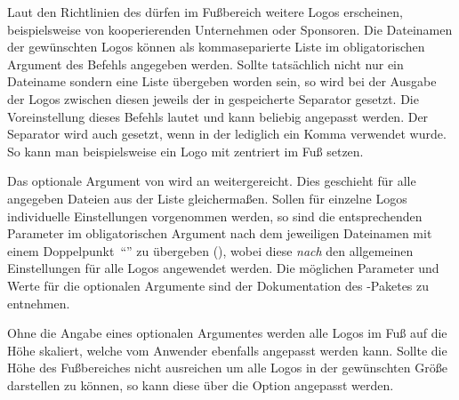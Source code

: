 \begin{Declaration}[v2.03]{%
  \LParameter{}%
}
\begin{Declaration}[v2.03]{}%
\begin{Declaration}[v2.03]{}%
\printdeclarationlist%
%
%

Laut den Richtlinien des \CDs dürfen im Fußbereich weitere Logos erscheinen, 
beispielsweise von kooperierenden Unternehmen oder Sponsoren. Die Dateinamen 
der gewünschten Logos können als kommaseparierte Liste im obligatorischen 
Argument des Befehls  angegeben werden. Sollte tatsächlich 
nicht nur ein Dateiname sondern eine Liste übergeben worden sein, so wird bei 
der Ausgabe der Logos zwischen diesen jeweils der in  
gespeicherte Separator gesetzt. Die Voreinstellung dieses Befehls lautet
 und kann 
beliebig angepasst werden. Der Separator wird auch gesetzt, wenn in der 
 lediglich ein Komma verwendet wurde. So kann man 
beispielsweise ein Logo mit  
zentriert im Fuß setzen.

Das optionale Argument von  wird an  
weitergereicht. Dies geschieht für alle angegeben Dateien aus der Liste 
gleichermaßen. Sollen für einzelne Logos individuelle Einstellungen vorgenommen 
werden, so sind die entsprechenden Parameter im obligatorischen Argument nach 
dem jeweiligen Dateinamen mit einem Doppelpunkt~\enquote{\PValue{:}} zu 
übergeben (), 
wobei diese \emph{nach} den allgemeinen Einstellungen für alle Logos angewendet 
werden. Die möglichen Parameter und Werte für die optionalen Argumente sind der 
Dokumentation des -Paketes zu entnehmen.

Ohne die Angabe eines optionalen Argumentes werden alle Logos im Fuß auf die 
Höhe  skaliert, welche vom Anwender ebenfalls angepasst 
werden kann. Sollte die Höhe des Fußbereiches nicht ausreichen um alle Logos in 
der gewünschten Größe darstellen zu können, so kann diese über die Option 
 angepasst werden.
\end{Declaration}
\end{Declaration}
\end{Declaration}

